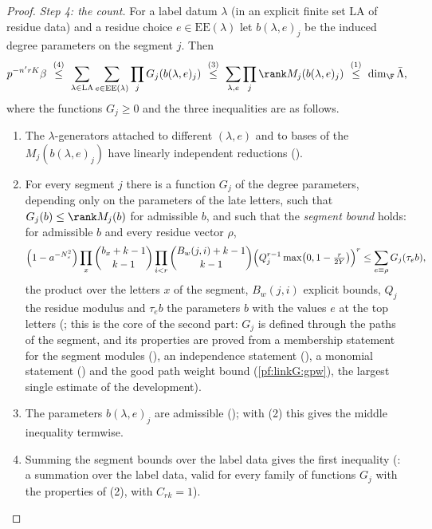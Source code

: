 \begin{proof}
\emph{Step 4: the count.} For a label datum $\lambda$ (in an explicit finite set $\mathrm{LA}$ of residue data) and a residue
choice $e\in\mathrm{EE}(\lambda)$ let $b(\lambda,e)_j$ be the induced degree parameters on the segment $j$. Then
\[
p^{-n'rK}\beta\ \overset{(4)}{\le}\ \sum_{\lambda\in\mathrm{LA}}\sum_{e\in\mathrm{EE}(\lambda)}\prod_jG_j(b(\lambda,e)_j)
\ \overset{(3)}{\le}\ \sum_{\lambda,e}\prod_j\rank M_j(b(\lambda,e)_j)\ \overset{(1)}{\le}\ \dim_\F\bar\Lambda,
\]
where the functions $G_j\ge0$ and the three inequalities are as follows.
\begin{enumerate}[label=(\arabic*)]
\item The $\lambda$-generators attached to different $(\lambda,e)$ and to bases of the $M_j(b(\lambda,e)_j)$ have linearly
independent reductions ().
\item For every segment $j$ there is a function $G_j$ of the degree parameters, depending only on the parameters of the late
letters, such that $G_j(b)\le\rank M_j(b)$ for admissible $b$, and such that the \emph{segment bound} holds: for admissible $b$
and every residue vector $\rho$,
\[
\Bigl(1-a^{-N_s^2}\Bigr)\prod_{x}\binom{b_x+k-1}{k-1}\prod_{i<r}\binom{B_w(j,i)+k-1}{k-1}\Bigl(Q_j^{r-1}\max\bigl(0,1-\tfrac r{2Y}\bigr)\Bigr)^r
\le\sum_{e\equiv\rho}G_j(\tau_e b),
\]
the product over the letters $x$ of the segment, $B_w(j,i)$ explicit bounds, $Q_j$ the residue modulus and $\tau_eb$ the
parameters $b$ with the values $e$ at the top letters
(; this is the core of the second part: $G_j$ is defined
through the paths of the segment, and its properties are proved from a membership statement for the segment modules
(), an independence statement
(), a monomial statement
() and the good path weight bound
(\cref{pf:linkG:gpw}), the largest single estimate of the development).
\item The parameters $b(\lambda,e)_j$ are admissible (); with (2)
this gives the middle inequality termwise.
\item Summing the segment bounds over the label data gives the first inequality
(: a summation over the label data, valid for every family of
functions $G_j$ with the properties of (2), with $C_{rk}=1$).
\end{enumerate}


\end{proof}
